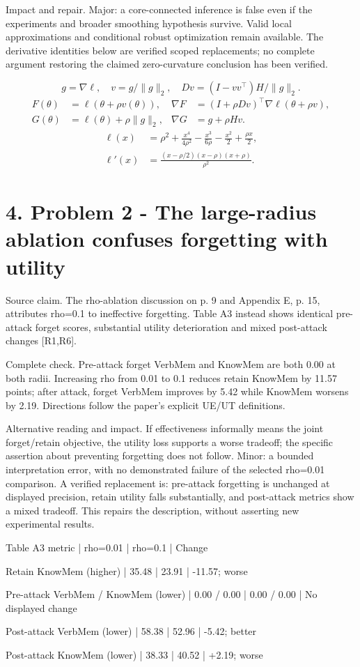 \documentclass[10pt]{article}
\begin{document}
Impact and repair. Major: a core-connected inference is false even if the experiments and broader smoothing hypothesis survive. Valid local approximations and conditional robust optimization remain available. The derivative identities below are verified scoped replacements; no complete argument restoring the claimed zero-curvature conclusion has been verified.\par
\[g=\nabla\ell,\quad v=g/\|g\|_2,\quad Dv=(I-vv^\top)H/\|g\|_2.\] \[\begin{aligned}F(\theta)&=\ell(\theta+\rho v(\theta)),&
\nabla F&=(I+\rho Dv)^\top\nabla\ell(\theta+\rho v),\\
G(\theta)&=\ell(\theta)+\rho\|g\|_2,&
\nabla G&=g+\rho Hv.\end{aligned}\] \[\begin{aligned}\ell(x)&=\rho^2+\frac{x^4}{4\rho^2}-\frac{x^3}{6\rho}-\frac{x^2}{2}+\frac{\rho x}{2},\\
\ell'(x)&=\frac{(x-\rho/\allowbreak{}2)(x-\rho)(x+\rho)}{\rho^2}.\end{aligned}\]\par
\section*{4. Problem 2 - The large-radius ablation confuses forgetting with utility}
Source claim. The rho-ablation discussion on p. 9 and Appendix E, p. 15, attributes rho=0.1 to ineffective forgetting. Table A3 instead shows identical pre-attack forget scores, substantial utility deterioration and mixed post-attack changes [R1,R6].\par
Complete check. Pre-attack forget VerbMem and KnowMem are both 0.00 at both radii. Increasing rho from 0.01 to 0.1 reduces retain KnowMem by 11.57 points; after attack, forget VerbMem improves by 5.42 while KnowMem worsens by 2.19. Directions follow the paper’s explicit UE/UT definitions.\par
Alternative reading and impact. If effectiveness informally means the joint forget/retain objective, the utility loss supports a worse tradeoff; the specific assertion about preventing forgetting does not follow. Minor: a bounded interpretation error, with no demonstrated failure of the selected rho=0.01 comparison. A verified replacement is: pre-attack forgetting is unchanged at displayed precision, retain utility falls substantially, and post-attack metrics show a mixed tradeoff. This repairs the description, without asserting new experimental results.\par
Table A3 metric | rho=0.01 | rho=0.1 | Change\par
Retain KnowMem (higher) | 35.48 | 23.91 | -11.57; worse\par
Pre-attack VerbMem / KnowMem (lower) | 0.00 / 0.00 | 0.00 / 0.00 | No displayed change\par
Post-attack VerbMem (lower) | 58.38 | 52.96 | -5.42; better\par
Post-attack KnowMem (lower) | 38.33 | 40.52 | +2.19; worse\par
\end{document}
